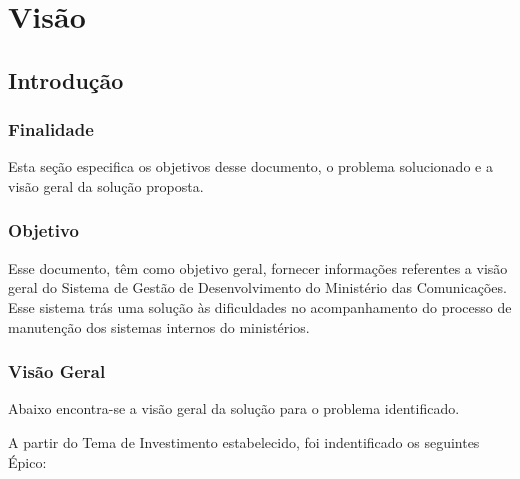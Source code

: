 \chapter[Visão]{Visão}
\label{apendices:visao}

\section{Introdução}

\subsection{Finalidade}

Esta seção especifica os objetivos desse documento, o problema solucionado e a visão geral da solução proposta.

\subsection{Objetivo}

Esse documento, têm como objetivo geral, fornecer informações referentes a visão geral do Sistema de Gestão de Desenvolvimento do Ministério das Comunicações. Esse sistema trás uma solução às dificuldades no acompanhamento do processo de manutenção dos sistemas internos do ministérios.

\subsection{Visão Geral}

Abaixo encontra-se a visão geral da solução para o problema identificado.

A partir do Tema de Investimento estabelecido, foi indentificado os seguintes Épico:

